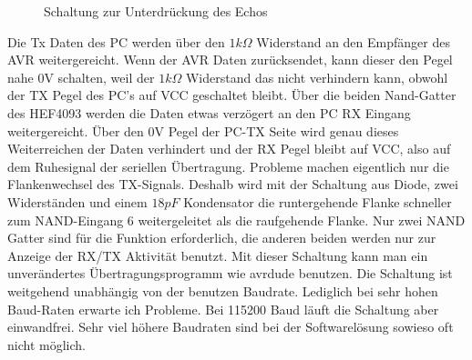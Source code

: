 \begin{figure}[H]
\centering
{}
\caption{Schaltung zur Unterdrückung des Echos}
\label{fig:onewire}
\end{figure}

Die Tx Daten des PC werden über den \(1k \Omega\) Widerstand an den Empfänger des AVR weitergereicht.
Wenn der AVR Daten zurücksendet, kann dieser den Pegel nahe 0V schalten, weil der \(1k \Omega\) Widerstand
das nicht verhindern kann, obwohl der TX Pegel des PC's auf VCC geschaltet bleibt. Über die beiden
Nand-Gatter des HEF4093 werden die Daten etwas verzögert an den PC RX Eingang weitergereicht.
Über den 0V Pegel der PC-TX Seite wird genau dieses Weiterreichen der Daten verhindert und der
RX Pegel bleibt auf VCC, also auf dem Ruhesignal der seriellen Übertragung.
Probleme machen eigentlich nur die Flankenwechsel des TX-Signals. Deshalb wird mit der
Schaltung aus Diode, zwei Widerständen und einem \(18 pF\) Kondensator die runtergehende Flanke
schneller zum NAND-Eingang 6 weitergeleitet als die raufgehende Flanke.
Nur zwei NAND Gatter sind für die Funktion erforderlich, die anderen beiden werden nur
zur Anzeige der RX/TX Aktivität benutzt.
Mit dieser Schaltung kann man ein unverändertes Übertragungsprogramm wie avrdude benutzen.
Die Schaltung ist weitgehend unabhängig von der benutzen Baudrate.
Lediglich bei sehr hohen Baud-Raten erwarte ich Probleme. Bei 115200 Baud läuft die Schaltung
aber einwandfrei. Sehr viel höhere Baudraten sind bei der Softwarelösung sowieso
oft nicht möglich.\\

